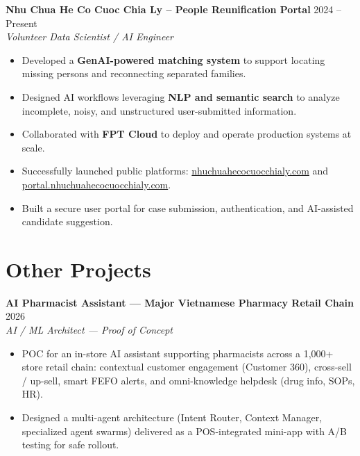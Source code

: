 \documentclass[10pt, letterpaper]{article}
\newenvironment{zitemize}{
\begin{itemize} \itemsep 0pt \parskip 0pt \parsep 1pt}
{\end{itemize}\vspace{-.5em}}
\begin{document}
\textbf{Nhu Chua He Co Cuoc Chia Ly – People Reunification Portal} \hfill 2024 – Present \\
\textit{Volunteer Data Scientist / AI Engineer} \\
\vspace{2mm}
\begin{zitemize}
    \vspace{-1mm}\item \small{Developed a \textbf{GenAI-powered matching system} to support locating missing persons and reconnecting separated families.}
    \item \small{Designed AI workflows leveraging \textbf{NLP and semantic search} to analyze incomplete, noisy, and unstructured user-submitted information.}
    \item \small{Collaborated with \textbf{FPT Cloud} to deploy and operate production systems at scale.}
    \item \small{Successfully launched public platforms:
    \href{https://nhuchuahecocuocchialy.com}{nhuchuahecocuocchialy.com} and
    \href{https://portal.nhuchuahecocuocchialy.com}{portal.nhuchuahecocuocchialy.com}.}
    \item \small{Built a secure user portal for case submission, authentication, and AI-assisted candidate suggestion.}
\end{zitemize}

\section{Other Projects}

\textbf{AI Pharmacist Assistant — Major Vietnamese Pharmacy Retail Chain} \hfill 2026 \\
\textit{AI / ML Architect — Proof of Concept} \\
\vspace{2mm}
\begin{zitemize}
    \vspace{-1mm}\item \small{POC for an in-store AI assistant supporting pharmacists across a 1,000+ store retail chain: contextual customer engagement (Customer 360), cross-sell / up-sell, smart FEFO alerts, and omni-knowledge helpdesk (drug info, SOPs, HR).}
    \item \small{Designed a multi-agent architecture (Intent Router, Context Manager, specialized agent swarms) delivered as a POS-integrated mini-app with A/B testing for safe rollout.}
\end{zitemize}
\end{document}
